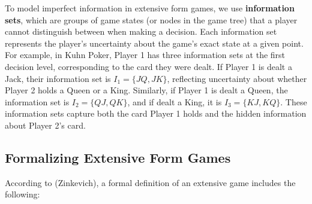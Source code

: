 \documentclass{article}
\begin{document}
To model imperfect information in extensive form games, we use \textbf{information sets}, which are groups of game states (or nodes in the game tree) that a player cannot distinguish between when making a decision. Each information set represents the player's uncertainty about the game's exact state at a given point. For example, in Kuhn Poker, Player 1 has three information sets at the first decision level, corresponding to the card they were dealt. If Player 1 is dealt a Jack, their information set is \( I_1 = \{JQ, JK\} \), reflecting uncertainty about whether Player 2 holds a Queen or a King. Similarly, if Player 1 is dealt a Queen, the information set is \( I_2 = \{QJ, QK\} \), and if dealt a King, it is \( I_3 = \{KJ, KQ\} \). These information sets capture both the card Player 1 holds and the hidden information about Player 2’s card.


\subsection{Formalizing Extensive Form Games}

According to (Zinkevich), a formal definition of an extensive game includes the following:
\end{document}
